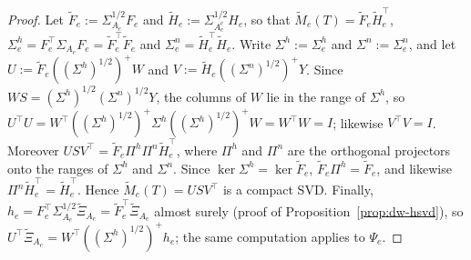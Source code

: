 \documentclass[11pt]{article}
\theoremstyle{definition}
\numberwithin{equation}{section}
\begin{document}
\begin{proof}
Let $\tilde F_e:=\Sigma_{A_e}^{1/2}F_e$ and $\tilde H_e:=\Sigma_{A_e^c}^{1/2}H_e$, so that $\tilde M_e(T)=\tilde F_e\tilde H_e^\top$, $\Sigma^h_e=F_e^\top\Sigma_{A_e}F_e=\tilde F_e^\top\tilde F_e$ and $\Sigma^n_e=\tilde H_e^\top\tilde H_e$. Write $\Sigma^h:=\Sigma^h_e$ and $\Sigma^n:=\Sigma^n_e$, and let $U:=\tilde F_e((\Sigma^h)^{1/2})^+W$ and $V:=\tilde H_e((\Sigma^n)^{1/2})^+Y$. Since $WS=(\Sigma^h)^{1/2}(\Sigma^n)^{1/2}Y$, the columns of $W$ lie in the range of $\Sigma^h$, so $U^\top U=W^\top((\Sigma^h)^{1/2})^+\Sigma^h((\Sigma^h)^{1/2})^+W=W^\top W=I$; likewise $V^\top V=I$. Moreover $USV^\top=\tilde F_e\Pi^h\Pi^n\tilde H_e^\top$, where $\Pi^h$ and $\Pi^n$ are the orthogonal projectors onto the ranges of $\Sigma^h$ and $\Sigma^n$. Since $\ker\Sigma^h=\ker\tilde F_e$, $\tilde F_e\Pi^h=\tilde F_e$, and likewise $\Pi^n\tilde H_e^\top=\tilde H_e^\top$. Hence $\tilde M_e(T)=USV^\top$ is a compact SVD. Finally, $h_e=F_e^\top\Sigma_{A_e}^{1/2}\tilde\Xi_{A_e}=\tilde F_e^\top\tilde\Xi_{A_e}$ almost surely (proof of Proposition~\ref{prop:dw-hsvd}), so $U^\top\tilde\Xi_{A_e}=W^\top((\Sigma^h)^{1/2})^+h_e$; the same computation applies to $\Psi_e$.
\end{proof}
\end{document}
